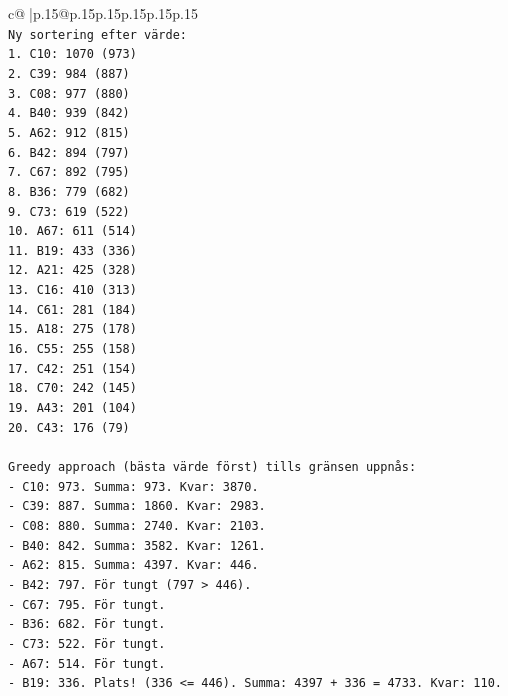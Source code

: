 \documentclass{article}
\begin{document}
{\begin{supertabular}{c@{$\;$}|p{.15\linewidth}@{}p{.15\linewidth}p{.15\linewidth}p{.15\linewidth}p{.15\linewidth}p{.15\linewidth}}
{{{\\ 
\texttt{Ny sortering efter värde:} \\
\texttt{1. C10: 1070 (973)} \\
\texttt{2. C39: 984 (887)} \\
\texttt{3. C08: 977 (880)} \\
\texttt{4. B40: 939 (842)} \\
\texttt{5. A62: 912 (815)} \\
\texttt{6. B42: 894 (797)} \\
\texttt{7. C67: 892 (795)} \\
\texttt{8. B36: 779 (682)} \\
\texttt{9. C73: 619 (522)} \\
\texttt{10. A67: 611 (514)} \\
\texttt{11. B19: 433 (336)} \\
\texttt{12. A21: 425 (328)} \\
\texttt{13. C16: 410 (313)} \\
\texttt{14. C61: 281 (184)} \\
\texttt{15. A18: 275 (178)} \\
\texttt{16. C55: 255 (158)} \\
\texttt{17. C42: 251 (154)} \\
\texttt{18. C70: 242 (145)} \\
\texttt{19. A43: 201 (104)} \\
\texttt{20. C43: 176 (79)} \\
\\ 
\texttt{Greedy approach (bästa värde först) tills gränsen uppnås:} \\
\texttt{{-} C10: 973. Summa: 973. Kvar: 3870.} \\
\texttt{{-} C39: 887. Summa: 1860. Kvar: 2983.} \\
\texttt{{-} C08: 880. Summa: 2740. Kvar: 2103.} \\
\texttt{{-} B40: 842. Summa: 3582. Kvar: 1261.} \\
\texttt{{-} A62: 815. Summa: 4397. Kvar: 446.} \\
\texttt{{-} B42: 797. För tungt (797 > 446).} \\
\texttt{{-} C67: 795. För tungt.} \\
\texttt{{-} B36: 682. För tungt.} \\
\texttt{{-} C73: 522. För tungt.} \\
\texttt{{-} A67: 514. För tungt.} \\
\texttt{{-} B19: 336. Plats! (336 <= 446). Summa: 4397 + 336 = 4733. Kvar: 110.} \\
}}}
\end{supertabular}}
\end{document}
